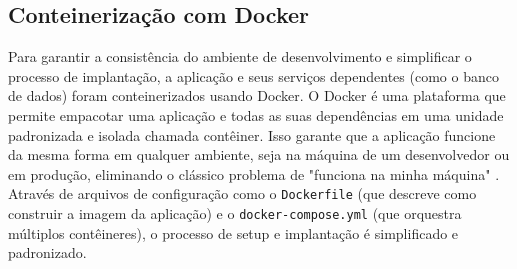 \subsection{Conteinerização com Docker}

Para garantir a consistência do ambiente de desenvolvimento e simplificar o processo de implantação, a aplicação e seus serviços dependentes (como o banco de dados) foram conteinerizados usando Docker. O Docker é uma plataforma que permite empacotar uma aplicação e todas as suas dependências em uma unidade padronizada e isolada chamada contêiner. Isso garante que a aplicação funcione da mesma forma em qualquer ambiente, seja na máquina de um desenvolvedor ou em produção, eliminando o clássico problema de "funciona na minha máquina" \cite{docker2025overview}. Através de arquivos de configuração como o \texttt{Dockerfile} (que descreve como construir a imagem da aplicação) e o \texttt{docker-compose.yml} (que orquestra múltiplos contêineres), o processo de setup e implantação é simplificado e padronizado.

